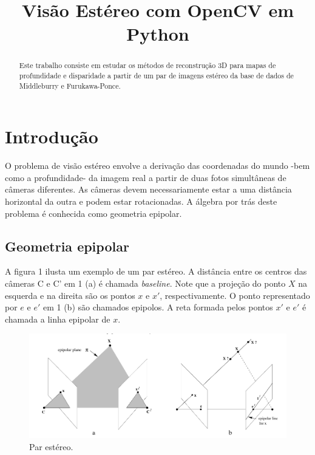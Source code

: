 \documentclass{bmvc2k}
\title{Visão Estéreo com OpenCV em Python}
\begin{document}
\maketitle


\begin{abstract}
Este trabalho consiste em estudar os métodos de reconstru\c{c}ão 3D para mapas de profundidade e disparidade a partir de um par de imagens estéreo da base de dados de Middleburry e Furukawa-Ponce.
\end{abstract}

\section{Introdu\c{c}ão}
\label{sec:intro}

O problema de visão estéreo envolve a deriva\c{c}ão das coordenadas do mundo -bem como a profundidade- da imagem real a partir de duas fotos simultâneas de câmeras diferentes. As câmeras devem necessariamente estar a uma distância horizontal da outra e podem estar rotacionadas. A álgebra por trás deste problema é conhecida como geometria epipolar.

\subsection{Geometria epipolar}

A figura 1 ilusta um exemplo de um par estéreo. A distância entre os centros das câmeras C e C' em 1 (a) é chamada \textit{baseline}. Note que a proje\c{c}ão do ponto $X$ na esquerda e na direita são os pontos $x$ e $x'$, respectivamente. O ponto representado por $e$ e $e'$ em 1 (b) são chamados epipolos. A reta formada pelos pontos $x'$ e $e'$ é chamada a linha epipolar de $x$.

\begin{figure}[htbp]
            \centering
            \includegraphics[scale=0.4]{Figs/epipolar.png}
            \caption{Par estéreo.\cite{Zisserman}}
            \label{1}
        \end{figure}
\end{document}
